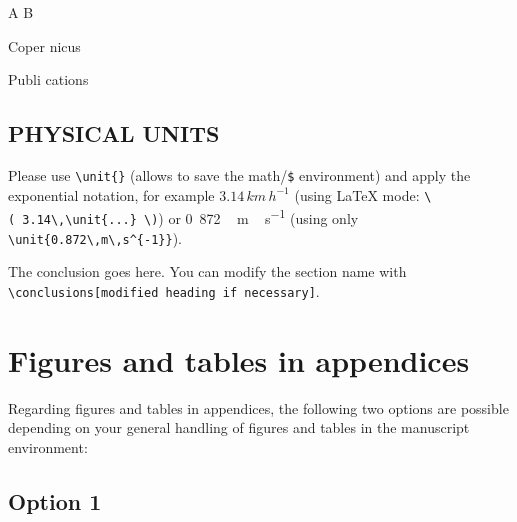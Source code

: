 \documentclass[, manuscript]{copernicus}
\begin{document}
\begin{reaction}
A \rightarrow B \\
\end{reaction}
\begin{reaction}
Coper \rightleftharpoons nicus \\
\end{reaction}
\begin{reaction}
Publi \leftrightarrow cations
\end{reaction}

\subsection{PHYSICAL UNITS}

Please use \texttt{\textbackslash{}unit\{\}} (allows to save the
math/\texttt{\$} environment) and apply the exponential notation, for
example \(3.14\,\unit{km\,h^{-1}}\) (using LaTeX mode:
\texttt{\textbackslash{}(\ 3.14\textbackslash{},\textbackslash{}unit\{...\}\ \textbackslash{})})
or \unit{0.872\,m\,s^{-1}} (using only
\texttt{\textbackslash{}unit\{0.872\textbackslash{},m\textbackslash{},s\^{}\{-1\}\}}).

\conclusions

The conclusion goes here. You can modify the section name with
\texttt{\textbackslash{}conclusions{[}modified\ heading\ if\ necessary{]}}.








\appendix
\section{Figures and tables in appendices}

Regarding figures and tables in appendices, the following two options
are possible depending on your general handling of figures and tables in
the manuscript environment:

\subsection{Option 1}
\end{document}
